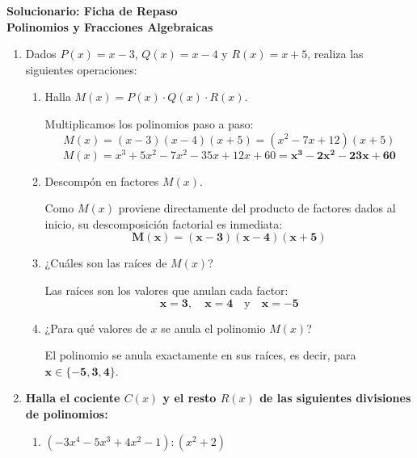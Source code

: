 \documentclass[11pt,a4paper]{article}
\begin{document}
\shorthandoff{<>}

\begin{center}
    {\LARGE \textbf{Solucionario: Ficha de Repaso}}\\[0.2cm]
    {\large \textbf{Polinomios y Fracciones Algebraicas}}\\[0.4cm]
\end{center}


\begin{enumerate}[label=\textbf{\arabic*.}, leftmargin=*]

    \item Dados $P(x) = x - 3$, $Q(x) = x - 4$ y $R(x) = x + 5$, realiza las siguientes operaciones:
        \begin{enumerate}[label=\textit{\alph*})]
            \item Halla $M(x) = P(x) \cdot Q(x) \cdot R(x)$.
            
             Multiplicamos los polinomios paso a paso:
            $$M(x) = (x - 3)(x - 4)(x + 5) = (x^2 - 7x + 12)(x + 5)$$
            $$M(x) = x^3 + 5x^2 - 7x^2 - 35x + 12x + 60 = \mathbf{x^3 - 2x^2 - 23x + 60}$$

            \item Descompón en factores $M(x)$.
            
             Como $M(x)$ proviene directamente del producto de factores dados al inicio, su descomposición factorial es inmediata:
            $$\mathbf{M(x) = (x - 3)(x - 4)(x + 5)}$$

            \item ¿Cuáles son las raíces de $M(x)$?
            
             Las raíces son los valores que anulan cada factor: 
            $$\mathbf{x = 3}, \quad \mathbf{x = 4} \quad \text{y} \quad \mathbf{x = -5}$$

            \item ¿Para qué valores de $x$ se anula el polinomio $M(x)$?
            
             El polinomio se anula exactamente en sus raíces, es decir, para $\mathbf{x \in \{-5, 3, 4\}}$.
        \end{enumerate}

    \item \textbf{Halla el cociente $C(x)$ y el resto $R(x)$ de las siguientes divisiones de polinomios:}
        \begin{enumerate}[label=\alph*), itemsep=1em]
            \item $(-3x^4 - 5x^3 + 4x^2 - 1) : (x^2 + 2)$
            

\end{enumerate}
\end{enumerate}
\end{document}
